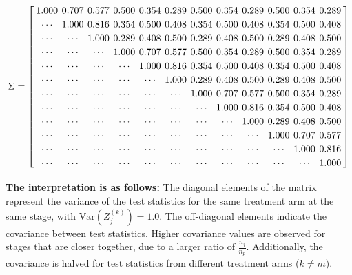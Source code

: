 \documentclass[11pt, a4paper]{article}\usepackage[]{graphicx}\usepackage[]{xcolor}
\begin{document}
\begin{equation}
\Sigma =
\renewcommand{\arraystretch}{1.2} %
\setlength{\arraycolsep}{2pt} %
\left[
\begin{array}{cccccccccccc}
1.000 & 0.707 & 0.577 & 0.500 & 0.354 & 0.289 & 0.500 & 0.354 & 0.289 & 0.500 & 0.354 & 0.289 \\
\cdots & 1.000 & 0.816 & 0.354 & 0.500 & 0.408 & 0.354 & 0.500 & 0.408 & 0.354 & 0.500 & 0.408 \\
\cdots & \cdots & 1.000 & 0.289 & 0.408 & 0.500 & 0.289 & 0.408 & 0.500 & 0.289 & 0.408 & 0.500 \\
\cdots & \cdots & \cdots & 1.000 & 0.707 & 0.577 & 0.500 & 0.354 & 0.289 & 0.500 & 0.354 & 0.289 \\
\cdots & \cdots & \cdots & \cdots & 1.000 & 0.816 & 0.354 & 0.500 & 0.408 & 0.354 & 0.500 & 0.408 \\
\cdots & \cdots & \cdots & \cdots & \cdots & 1.000 & 0.289 & 0.408 & 0.500 & 0.289 & 0.408 & 0.500 \\
\cdots & \cdots & \cdots & \cdots & \cdots & \cdots & 1.000 & 0.707 & 0.577 & 0.500 & 0.354 & 0.289 \\
\cdots & \cdots & \cdots & \cdots & \cdots & \cdots & \cdots & 1.000 & 0.816 & 0.354 & 0.500 & 0.408 \\
\cdots & \cdots & \cdots & \cdots & \cdots & \cdots & \cdots & \cdots & 1.000 & 0.289 & 0.408 & 0.500 \\
\cdots & \cdots & \cdots & \cdots & \cdots & \cdots & \cdots & \cdots & \cdots & 1.000 & 0.707 & 0.577 \\
\cdots & \cdots & \cdots & \cdots & \cdots & \cdots & \cdots & \cdots & \cdots & \cdots & 1.000 & 0.816 \\
\cdots & \cdots & \cdots & \cdots & \cdots & \cdots & \cdots & \cdots & \cdots & \cdots & \cdots & 1.000 \\
\end{array}
\right] \label{eq:covariance_matrix_big}
\end{equation}


\textbf{The interpretation is as follows:} The diagonal elements of the matrix represent the variance of the test statistics for the same treatment arm at the same stage, with
$\text{Var}(Z_j^{(k)}) = 1.0$. The off-diagonal elements indicate the covariance between test statistics. Higher covariance values are observed for stages that are closer together, due to a larger ratio of $\frac{n_j}{n_p}$. Additionally, the covariance is halved for test statistics from different treatment arms ($k \neq m$).
\end{document}
